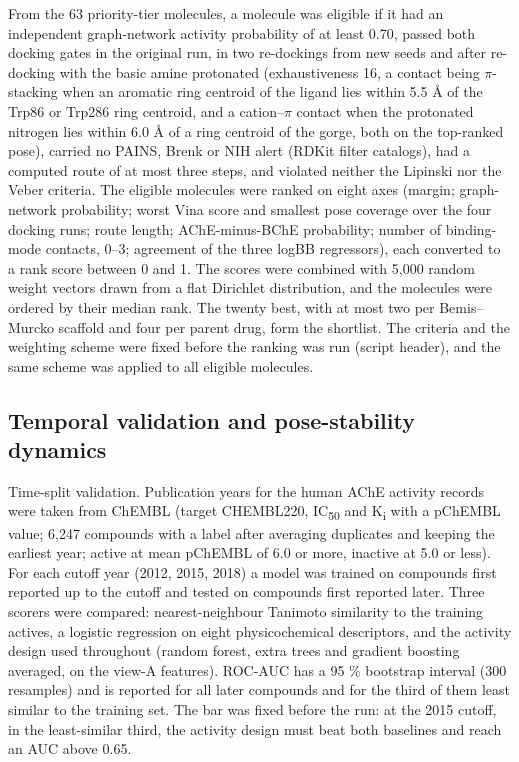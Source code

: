 \documentclass[11pt,a4paper]{article}
\begin{document}
From the 63 priority-tier molecules, a molecule was eligible if it had an independent graph-network activity probability of at least 0.70, passed both docking gates in the original run, in two re-dockings from new seeds and after re-docking with the basic amine protonated (exhaustiveness 16, a contact being $\pi$-stacking when an aromatic ring centroid of the ligand lies within 5.5 \AA{} of the Trp86 or Trp286 ring centroid, and a cation--$\pi$ contact when the protonated nitrogen lies within 6.0 \AA{} of a ring centroid of the gorge, both on the top-ranked pose), carried no PAINS, Brenk or NIH alert (RDKit filter catalogs), had a computed route of at most three steps, and violated neither the Lipinski nor the Veber criteria. The eligible molecules were ranked on eight axes (margin; graph-network probability; worst Vina score and smallest pose coverage over the four docking runs; route length; AChE-minus-BChE probability; number of binding-mode contacts, 0--3; agreement of the three logBB regressors), each converted to a rank score between 0 and 1. The scores were combined with 5,000 random weight vectors drawn from a flat Dirichlet distribution, and the molecules were ordered by their median rank. The twenty best, with at most two per Bemis--Murcko scaffold and four per parent drug, form the shortlist. The criteria and the weighting scheme were fixed before the ranking was run (script header), and the same scheme was applied to all eligible molecules.

\subsection{Temporal validation and pose-stability dynamics}
\label{sec:timemd}

Time-split validation. Publication years for the human AChE activity records were taken from ChEMBL (target CHEMBL220, IC\textsubscript{50} and K\textsubscript{i} with a pChEMBL value; 6,247 compounds with a label after averaging duplicates and keeping the earliest year; active at mean pChEMBL of 6.0 or more, inactive at 5.0 or less). For each cutoff year (2012, 2015, 2018) a model was trained on compounds first reported up to the cutoff and tested on compounds first reported later. Three scorers were compared: nearest-neighbour Tanimoto similarity to the training actives, a logistic regression on eight physicochemical descriptors, and the activity design used throughout (random forest, extra trees and gradient boosting averaged, on the view-A features). ROC-AUC has a 95 \% bootstrap interval (300 resamples) and is reported for all later compounds and for the third of them least similar to the training set. The bar was fixed before the run: at the 2015 cutoff, in the least-similar third, the activity design must beat both baselines and reach an AUC above 0.65.
\end{document}
